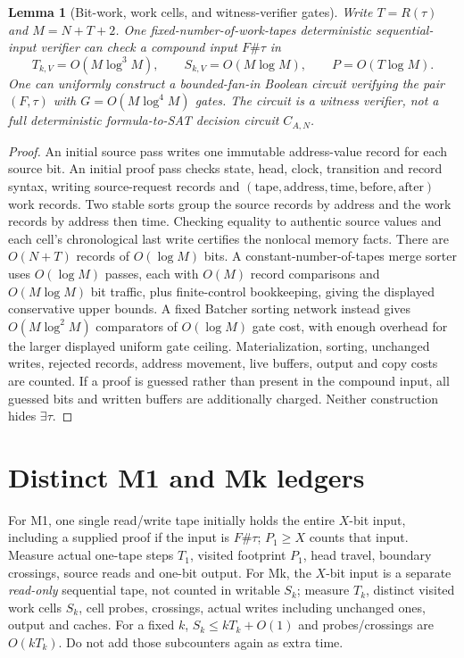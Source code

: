 \documentclass[11pt]{article}
\newtheorem{lemma}[theorem]{Lemma}
\begin{document}
\begin{lemma}[Bit-work, work cells, and witness-verifier gates]\label{lem:multi}
Write $T=R(\tau)$ and $M=N+T+2$. One fixed-number-of-work-tapes
deterministic sequential-input verifier can check a compound input
$F\#\tau$ in
\[
 T_{k,V}=O(M\log^3 M),\qquad
 S_{k,V}=O(M\log M),\qquad
 P=O(T\log M).
\tag{1}
\]
One can uniformly construct a bounded-fan-in Boolean circuit verifying
the \emph{pair} $(F,\tau)$ with
$G=O(M\log^4 M)$ gates. The circuit is a \emph{witness verifier},
not a full deterministic formula-to-SAT decision circuit $C_{A,N}$.
\end{lemma}
\begin{proof}
An initial source pass writes one immutable address-value record for
each source bit. An initial proof pass checks state, head, clock,
transition and record syntax, writing source-request records and
$(\mathrm{tape},\mathrm{address},\mathrm{time},\mathrm{before},
\mathrm{after})$ work records. Two stable sorts group the source
records by address and the work records by address then time.
Checking equality to authentic source values and each cell's
chronological last write certifies the nonlocal memory facts.
There are $O(N+T)$ records of $O(\log M)$ bits. A constant-number-of-tapes
merge sorter uses $O(\log M)$ passes, each with $O(M)$ record
comparisons and $O(M\log M)$ bit traffic, plus finite-control
bookkeeping, giving the displayed conservative upper bounds.
A fixed Batcher sorting network instead gives $O(M\log^2 M)$
comparators of $O(\log M)$ gate cost, with enough overhead for the
larger displayed uniform gate ceiling. Materialization, sorting,
unchanged writes, rejected records, address movement, live buffers,
output and copy costs are counted. If a proof is guessed rather than
present in the compound input, all guessed bits and written buffers
are additionally charged. Neither construction hides $\exists\tau$.
\end{proof}

\section{Distinct M1 and Mk ledgers}
For M1, one single read/write tape initially holds the entire
$X$-bit input, including a supplied proof if the input is
$F\#\tau$; $P_1\ge X$ counts that input. Measure actual one-tape
steps $T_1$, visited footprint $P_1$, head travel, boundary crossings,
source reads and one-bit output. For Mk, the $X$-bit input is a
separate \emph{read-only} sequential tape, not counted in writable
$S_k$; measure $T_k$, distinct visited work cells $S_k$, cell probes,
crossings, actual writes including unchanged ones, output and caches.
For a fixed $k$, $S_k\le kT_k+O(1)$ and probes/crossings are
$O(kT_k)$. Do not add those subcounters again as extra time.
\end{document}
